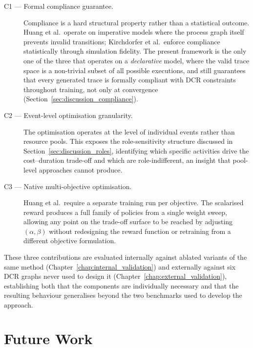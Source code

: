 \begin{description}

    \item[C1 --- Formal compliance guarantee.] Compliance is a hard structural property rather than a statistical outcome. Huang et al.\ operate on imperative models where the process graph itself prevents invalid transitions; Kirchdorfer et al.\ enforce compliance statistically through simulation fidelity. The present framework is the only one of the three that operates on a \emph{declarative} model, where the valid trace space is a non-trivial subset of all possible executions, and still guarantees that every generated trace is formally compliant with \ac{DCR} constraints throughout training, not only at convergence (Section~\ref{sec:discussion_compliance}).

    \item[C2 --- Event-level optimisation granularity.] The optimisation operates at the level of individual events rather than resource pools. This exposes the role-sensitivity structure discussed in Section~\ref{sec:discussion_roles}, identifying which specific activities drive the cost--duration trade-off and which are role-indifferent, an insight that pool-level approaches cannot produce.

    \item[C3 --- Native multi-objective optimisation.] Huang et al.\ require a separate training run per objective. The scalarised reward produces a full family of policies from a single weight sweep, allowing any point on the trade-off surface to be reached by adjusting $(\alpha, \beta)$ without redesigning the reward function or retraining from a different objective formulation.

\end{description}

These three contributions are evaluated internally against ablated variants of the same method (Chapter~\ref{chap:internal_validation}) and externally against six \ac{DCR} graphs never used to design it (Chapter~\ref{chap:external_validation}), establishing both that the components are individually necessary and that the resulting behaviour generalises beyond the two benchmarks used to develop the approach.

\section{Future Work}
\label{sec:future_work}

